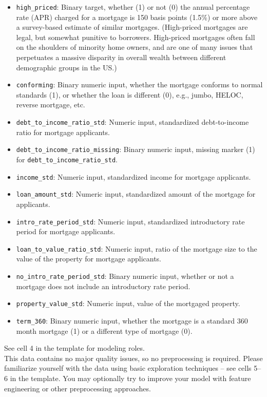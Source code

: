 \documentclass[fleqn]{article}
\begin{document}
\begin{itemize}\small
\item \texttt{high\_priced}: Binary target, whether (1) or not (0) the annual percentage rate (APR) charged for a mortgage is 150 basis points (1.5\%) or more above a survey-based estimate of similar mortgages. (High-priced mortgages are legal, but somewhat punitive to borrowers. High-priced mortgages often fall on the shoulders of minority home owners, and are one of many issues that perpetuates a massive disparity in overall wealth between different demographic groups in the US.)
\item \texttt{conforming}: Binary numeric input, whether the mortgage conforms to normal standards (1), or whether the loan is different (0), e.g., jumbo, HELOC, reverse mortgage, etc.
\item \texttt{debt\_to\_income\_ratio\_std}: Numeric input, standardized debt-to-income ratio for mortgage applicants. 
\item \texttt{debt\_to\_income\_ratio\_missing}: Binary numeric input, missing marker (1) for \texttt{debt\_to\_income\_ratio\_std}.
\item \texttt{income\_std}: Numeric input, standardized income for mortgage applicants. 
\item \texttt{loan\_amount\_std}: Numeric input, standardized amount of the mortgage for applicants. 
\item \texttt{intro\_rate\_period\_std}: Numeric input, standardized introductory rate period for mortgage applicants.
\item \texttt{loan\_to\_value\_ratio\_std}: Numeric input, ratio of the mortgage size to the value of the property for mortgage applicants. 
\item \texttt{no\_intro\_rate\_period\_std}: Binary numeric input, whether or not a mortgage does not include an introductory rate period.
\item \texttt{property\_value\_std}: Numeric input, value of the mortgaged property. 
\item \texttt{term\_360}: Binary numeric input, whether the mortgage is a standard 360 month mortgage (1) or a different type of mortgage (0).
\end{itemize}

\noindent See cell 4 in the template for modeling roles.\\

\noindent This data contains no major quality issues, so no preprocessing is required. Please familiarize yourself with the data using basic exploration techniques -- see cells 5--6 in the template. You may optionally try to improve your model with feature engineering or other preprocessing approaches.\\
\end{document}
